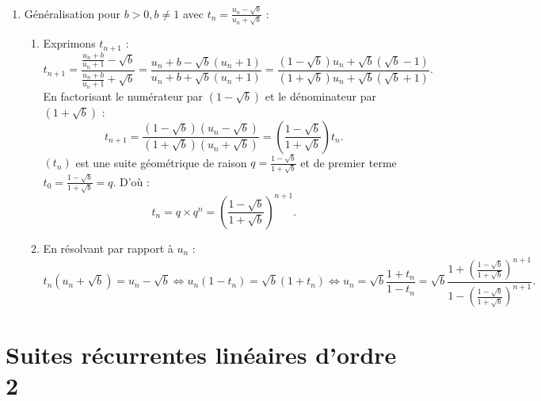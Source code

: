 \documentclass[11pt,a4paper]{article}
\begin{document}
\begin{correctionbox}
\begin{enumerate}
\begin{enumerate}
    \end{enumerate}
    \item Généralisation pour $b > 0, b \ne 1$ avec $t_n = \frac{u_n - \sqrt{b}}{u_n + \sqrt{b}}$ :
    \begin{enumerate}
        \item Exprimons $t_{n+1}$ :
        \[
        t_{n+1} = \frac{\frac{u_n+b}{u_n+1} - \sqrt{b}}{\frac{u_n+b}{u_n+1} + \sqrt{b}} = \frac{u_n + b - \sqrt{b}(u_n+1)}{u_n + b + \sqrt{b}(u_n+1)} = \frac{(1 - \sqrt{b})u_n + \sqrt{b}(\sqrt{b} - 1)}{(1 + \sqrt{b})u_n + \sqrt{b}(\sqrt{b} + 1)}.
        \]
        En factorisant le numérateur par $(1 - \sqrt{b})$ et le dénominateur par $(1 + \sqrt{b})$ :
        \[
        t_{n+1} = \frac{(1-\sqrt{b})(u_n - \sqrt{b})}{(1+\sqrt{b})(u_n + \sqrt{b})} = \left(\frac{1-\sqrt{b}}{1+\sqrt{b}}\right) t_n.
        \]
        $(t_n)$ est une suite géométrique de raison $q = \frac{1-\sqrt{b}}{1+\sqrt{b}}$ et de premier terme $t_0 = \frac{1-\sqrt{b}}{1+\sqrt{b}} = q$.
        D'où :
        \[
        t_n = q \times q^n = \left(\frac{1-\sqrt{b}}{1+\sqrt{b}}\right)^{n+1}.
        \]
        \item En résolvant par rapport à $u_n$ :
        \[
        t_n(u_n + \sqrt{b}) = u_n - \sqrt{b} \iff u_n(1 - t_n) = \sqrt{b}(1 + t_n) \iff u_n = \sqrt{b} \frac{1 + t_n}{1 - t_n} = \sqrt{b} \frac{1 + \left(\frac{1-\sqrt{b}}{1+\sqrt{b}}\right)^{n+1}}{1 - \left(\frac{1-\sqrt{b}}{1+\sqrt{b}}\right)^{n+1}}.
        \]
    \end{enumerate}
\end{enumerate}
\end{correctionbox}


\section{Suites récurrentes linéaires d'ordre 2}

\end{document}
